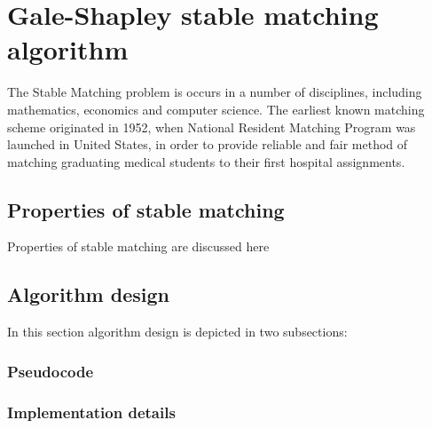 
\chapter{Gale-Shapley stable matching algorithm}
\ifpdf
    \graphicspath{{Chapter1/Chapter1Figs/PNG/}{Chapter1/Chapter1Figs/PDF/}{Chapter1/Chapter1Figs/}}
\else
    \graphicspath{{Chapter1/Chapter1Figs/EPS/}{Chapter1/Chapter1Figs/}}
\fi

The Stable Matching problem is occurs in a number of disciplines, including mathematics, economics and computer science. The earliest known matching scheme originated in 1952, when National Resident Matching Program was launched in United States, in order to provide reliable and fair method of matching graduating medical students to their first hospital assignments. \cite{nrmp}

\section{Properties of stable matching}
Properties of stable matching are discussed here

\section{Algorithm design}
In this section algorithm design is depicted in two subsections:

\subsection{Pseudocode}

\subsection{Implementation details}


